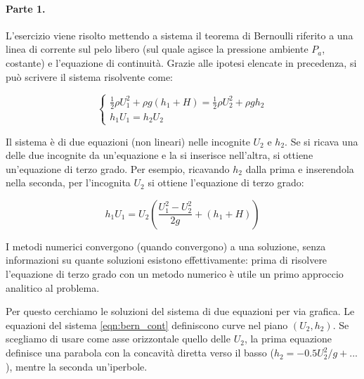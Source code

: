 \paragraph{Parte 1.}
L'esercizio viene risolto mettendo a sistema il teorema di Bernoulli riferito
 a una linea di corrente sul pelo libero
(sul quale agisce la pressione ambiente $P_a$, costante) e l'equazione di
 continuità.
Grazie alle ipotesi elencate in precedenza, si può scrivere il sistema risolvente come:

\begin{equation}\label{eqn:bern_cont}
  \begin{cases}
    \frac{1}{2}\rho U_1^2 + \rho g(h_1+H) = \frac{1}{2}\rho U_2^2 +
    \rho g h_2 \\
    h_1 U_1 = h_2 U_2
  \end{cases}
\end{equation}

Il sistema è di due equazioni (non lineari) nelle incognite $U_2$ e $h_2$. Se si ricava una delle due incognite
da un'equazione e la si inserisce nell'altra, si ottiene un'equazione di terzo grado. Per esempio, ricavando $h_2$ 
dalla prima e inserendola nella seconda, per l'incognita $U_2$ si ottiene l'equazione di terzo grado:

\begin{equation}
  h_1 U_1 = U_2 \displaystyle\left( \frac{U_1^2 - U_2^2}{2 g} + (h_1 + H)    \right)
\end{equation}


I metodi numerici convergono (quando convergono) a una soluzione, senza informazioni su quante soluzioni
esistono effettivamente: prima di risolvere l'equazione di terzo grado con un
 metodo numerico è utile un primo approccio analitico al problema. 

Per questo cerchiamo le soluzioni del sistema di due equazioni per via grafica. Le equazioni del sistema \ref{eqn:bern_cont}
 definiscono curve nel piano $(U_2,h_2)$. Se scegliamo di usare come asse orizzontale quello delle $U_2$, la prima equazione definisce una parabola con la concavità diretta verso il basso ($h_2 = - 0.5  U_2^2 /g +...$), mentre la seconda un'iperbole.
 
\begin{center}
\end{center}

